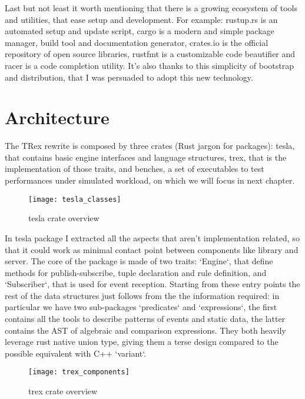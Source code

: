 Last but not least it worth mentioning that there is a growing ecosystem of tools and utilities, that ease setup and development. For example: rustup.rs is an automated setup and update script, cargo is a modern and simple package manager, build tool and documentation generator, crates.io is the official repository of open source libraries, rustfmt is a customizable code beautifier and racer is a code completion utility. It's also thanks to this simplicity of bootstrap and distribution, that I was persuaded to adopt this new technology.

\section{Architecture}
The TRex rewrite is composed by three crates (Rust jargon for packages): tesla, that contains basic engine interfaces and language structures, trex, that is the implementation of those traits, and benches,  a set of executables to test performances under simulated workload, on which we will focus in next chapter.

\begin{figure}[h]
  \centering
  \texttt{[image: tesla\_classes]}
  \caption{tesla crate overview}
\end{figure}

In tesla package I extracted all the aspects that aren't implementation related, so that it could work as minimal contact point between components like library and server. The core of the package is made of two traits: `Engine`, that define methods for publish-subscribe, tuple declaration and rule definition, and `Subscriber`, that is used for event reception. Starting from these entry points the rest of the data structures just follows from the the information required: in particular we have two sub-packages `predicates` and `expressions`, the first contains all the tools to describe patterns of events and static data, the latter contains the AST of algebraic and comparison expressions. They both heavily leverage rust native union type, giving them a terse design compared to the possible equivalent with C++ `variant`.

\begin{figure}[h]
  \centering
  \texttt{[image: trex\_components]}
  \caption{trex crate overview}
\end{figure}

